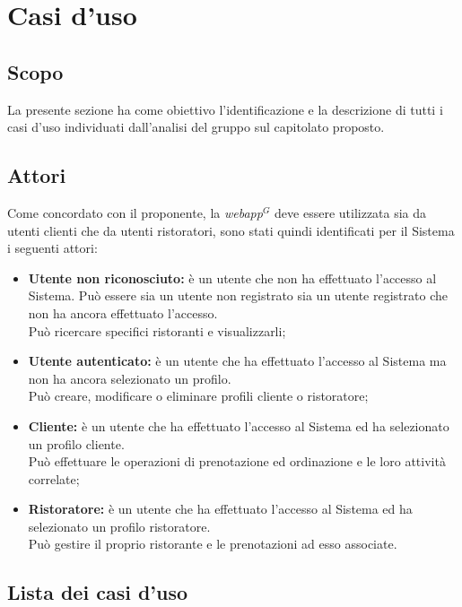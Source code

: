 \section{Casi d'uso}
\subsection{Scopo}

La presente sezione ha come obiettivo l'identificazione e la descrizione di tutti i casi d'uso individuati dall'analisi del gruppo sul capitolato proposto.
    
\subsection{Attori}
Come concordato con il proponente, la \emph{webapp}$^{G}$ deve essere utilizzata sia da utenti clienti che da utenti ristoratori, sono stati quindi identificati per il Sistema i seguenti attori:
\begin{itemize}
    \item \textbf{Utente non riconosciuto:} è un utente che non ha effettuato l'accesso al Sistema. Può essere sia un utente non registrato sia un utente registrato che non ha ancora effettuato l'accesso.\\
    Può ricercare specifici ristoranti e visualizzarli;
    \item \textbf{Utente autenticato:} è un utente che ha effettuato l'accesso al Sistema ma non ha ancora selezionato un profilo.\\ 
    Può creare, modificare o eliminare profili cliente o ristoratore;
    \item \textbf{Cliente:} è un utente che ha effettuato l'accesso al Sistema ed ha selezionato un profilo cliente.\\
    Può effettuare le operazioni di prenotazione ed ordinazione e le loro attività correlate;
    \item \textbf{Ristoratore:} è un utente che ha effettuato l'accesso al Sistema ed ha selezionato un profilo ristoratore.\\
    Può gestire il proprio ristorante e le prenotazioni ad esso associate.
\end{itemize}

\pagebreak
\subsection{Lista dei casi d'uso}








